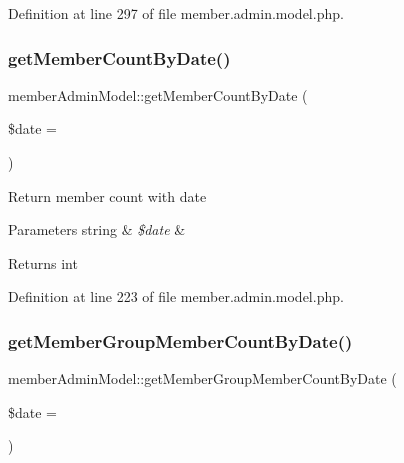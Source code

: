 Definition at line 297 of file member.\+admin.\+model.\+php.

\hypertarget{classmemberAdminModel_a53e4d56d174b1a188878a8adeba2c37f}{}\label{classmemberAdminModel_a53e4d56d174b1a188878a8adeba2c37f} 
\subsubsection{\texorpdfstring{get\+Member\+Count\+By\+Date()}{getMemberCountByDate()}}
{\footnotesize\ttfamily member\+Admin\+Model\+::get\+Member\+Count\+By\+Date (\begin{DoxyParamCaption}\item[{}]{\$date = {\ttfamily \textquotesingle{}\textquotesingle{}} }\end{DoxyParamCaption})}

Return member count with date


\begin{DoxyParams}[1]{Parameters}
string & {\em \$date} & \\
\hline
\end{DoxyParams}
\begin{DoxyReturn}{Returns}
int 
\end{DoxyReturn}


Definition at line 223 of file member.\+admin.\+model.\+php.

\hypertarget{classmemberAdminModel_a9c6795c459c9657539e2f09b36339522}{}\label{classmemberAdminModel_a9c6795c459c9657539e2f09b36339522} 
\subsubsection{\texorpdfstring{get\+Member\+Group\+Member\+Count\+By\+Date()}{getMemberGroupMemberCountByDate()}}
{\footnotesize\ttfamily member\+Admin\+Model\+::get\+Member\+Group\+Member\+Count\+By\+Date (\begin{DoxyParamCaption}\item[{}]{\$date = {\ttfamily \textquotesingle{}\textquotesingle{}} }\end{DoxyParamCaption})}

